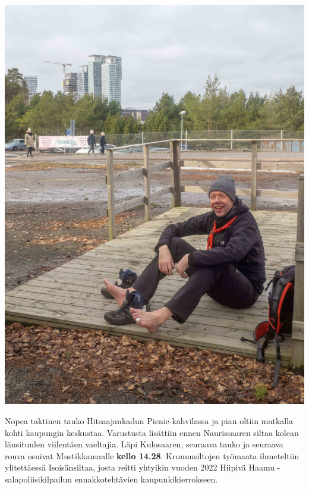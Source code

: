 \begin{multicols}{2}
	\noindent\includegraphics[width=\linewidth]{assets/nahkaliljamikko}

	Nopea taktinen tauko Hitsaajankadun Picnic-kahvilassa ja pian oltiin
	matkalla kohti kaupungin keskustaa. Varustusta lisättiin ennen
	Naurissaaren siltaa kolean länsituulen viilentäen vaeltajia. Läpi
	Kulosaaren, seuraava tauko ja seuraava rouva osuivat Mustikkamaalle
	\textbf{kello 14.28}. Kruunusiltojen työmaata ihmeteltiin ylitettäessä
	Isoisänsiltaa, josta reitti yhtyikin vuoden 2022 Hiipivä Haamu
	-salapoliisikilpailun ennakkotehtävien kaupunkikierrokseen.


\end{multicols}
